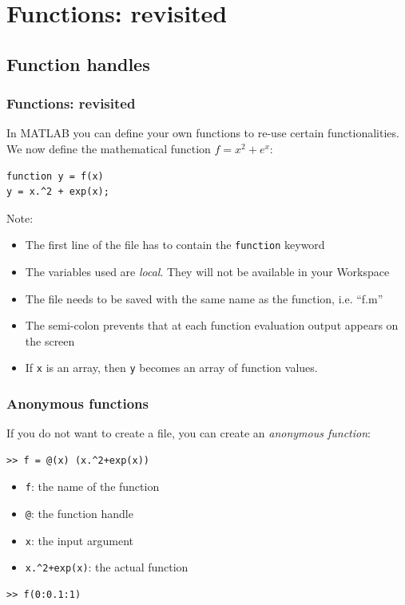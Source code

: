 \section{Functions: revisited}
\subsection*{Function handles}
\begin{frame}[fragile]
  \frametitle{Functions: revisited}
  In MATLAB you can define your own functions to re-use certain functionalities. We now define the mathematical function $f = x^2+e^x$:
  \begin{lstlisting}
function y = f(x)
y = x.^2 + exp(x);
  \end{lstlisting}
  \pause
  Note:
  \begin{itemize}
    \item The first line of the file has to contain the \lstinline$function$ keyword
    \item The variables used are \emph{local}. They will not be available in your Workspace
    \item The file needs to be saved with the same name as the function, i.e. ``f.m''
    \item The semi-colon prevents that at each function evaluation output appears on the screen
    \item If \lstinline$x$ is an array, then \lstinline$y$ becomes an array of function values.
  \end{itemize}
\end{frame}

\begin{frame}[fragile]
  \frametitle{Anonymous functions}
  If you do not want to create a file, you can create an \emph{anonymous function}:
  \begin{lstlisting}
>> f = @(x) (x.^2+exp(x))
  \end{lstlisting}
  \pause
  \begin{itemize}
    \item \lstinline$f$: the name of the function
    \item \lstinline$@$: the function handle
    \item \lstinline$x$: the input argument
    \item \lstinline$x.^2+exp(x)$: the actual function
  \end{itemize}\pause
  \begin{lstlisting}
>> f(0:0.1:1)   
  \end{lstlisting}
\end{frame}

